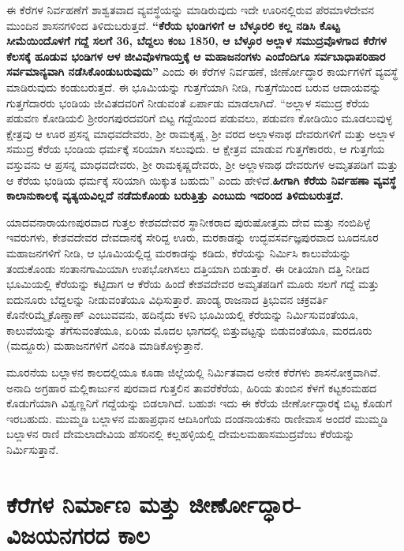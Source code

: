 ಈ ಕೆರೆಗಳ ನಿರ್ವಹಣೆಗೆ ಶಾಶ್ವತವಾದ ವ್ಯವಸ್ಥೆಯನ್ನು ಮಾಡಿರುವುದು ಇದೇ ಊರಿನಲ್ಲಿರುವ ಪೆರಮಾಳೆದೇವನ ಮುಂದಿನ ಶಾಸನಗಳಿಂದ ತಿಳಿದುಬರುತ್ತದೆ. \textbf{“ಕೆರೆಯ ಭಂಡಿಗಳಿಗೆ ಆ ಬೆಳ್ಳೂರಲಿ ಕಲ್ಲ ನಡಿಸಿ ಕೊಟ್ಟ ಸೀಮೆಯಿಂದೊಳಗೆ ಗದ್ದೆ ಸಲಗೆ 36, ಬೆದ್ದಲು ಕಂಬ 1850, ಆ ಬೆಳ್ಳೂರ ಅಲ್ಲಾಳ ಸಮುದ್ರವೊಳಗಾದ ಕೆರೆಗಳ ಕೆಲಸಕ್ಕೆ ಹೂಡುವ ಭಂಡಿಗಳ ಆಳ ಜೀವಿವೊಳಗಾಯ್ತಕ್ಕೆ ಆ ಮಹಾಜನಂಗಳು ಎಂದೆಂದಿಗೂ ಸರ್ವಬಾಧಾಪರಿಹಾರ ಸರ್ವಮಾನ್ಯವಾಗಿ ನಡೆಸಿಕೊಂಡುಬರುವುದು”} ಎಂದು ಈ ಕೆರೆಗಳ ನಿರ್ವಹಣೆ, ಜೀರ್ಣೋದ್ಧಾರ ಕಾರ್ಯಗಳಿಗೆ ವ್ಯವಸ್ಥೆ ಮಾಡಿರುವುದು ಕಂಡುಬರುತ್ತದೆ. ಈ ಭೂಮಿಯನ್ನು ಗುತ್ತಗೆಯಾಗಿ ನೀಡಿ, ಗುತ್ತಗೆಯಿಂದ ಬರುವ ಆದಾಯವನ್ನು ಗುತ್ತಗೆದಾರರು ಭಂಡಿಯ ಜೀವಿತದವರಿಗೆ ನೀಡುವಂತೆ ಏರ್ಪಾಡು ಮಾಡಲಾಗಿದೆ. “ಅಲ್ಲಾಳ ಸಮುದ್ರ ಕೆರೆಯ ಪಡುವಣ ಕೋಡಿಯಲಿ ಶ‍್ರೀರಂಗಪುರದವರಿಗೆ ಬಿಟ್ಟ ಗದ್ದೆಯಿಂದ ಪಡುವಲು, ಪಡುವಣ ಕೋಡಿಯಿಂ ಮೂಡಲುವುಳ್ಳ ಕ್ಷೇತ್ರವು ಆ ಊರ ಪ್ರಸನ್ನ ಮಾಧವದೇವರು, ಶ‍್ರೀ ರಾಮಕೃಷ್ಣ, ಶ‍್ರೀ ವರದ ಅಲ್ಲಾಳನಾಥ ದೇವರುಗಳಿಗೆ ಮತ್ತು ಅಲ್ಲಾಳ ಸಮುದ್ರ ಕೆರೆಯ ಭಂಡಿಯ ಧರ್ಮಕ್ಕೆ ಸರಿಯಾಗಿ ಸಲುವುದು. ಆ ಕ್ಷೇತ್ರವ ಮಾಡುವ ಗುತ್ತಗೆಕಾರರು, ಆ ಗುತ್ತಗೆಯ ವಸ್ತುವನು ಆ ಪ್ರಸನ್ನ ಮಾಧವದೇವರು, ಶ‍್ರೀ ರಾಮಕೃಷ್ಣದೇವರು, ಶ‍್ರೀ ಅಲ್ಲಾಳನಾಥ ದೇವರುಗಳ ಅಮೃತಪಡಿಗೆ ಮತ್ತು ಆ ಕೆರೆಯ ಭಂಡಿಯ ಧರ್ಮಕ್ಕೆ ಸರಿಯಾಗಿ ಯಿಕ್ಕುತ ಬಹುದು” ಎಂದು ಹೇಳಿದೆ.\textbf{ಹೀಗಾಗಿ ಕೆರೆಯ ನಿರ್ವಹಣಾ ವ್ಯವಸ್ಥೆ ಕಾಲಾನುಕಾಲಕ್ಕೆ ವ್ಯತ್ಯಯವಿಲ್ಲದೆ ನಡೆದುಕೊಂಡು ಬರುತ್ತಿತ್ತು ಎಂಬುದು ಇದರಿಂದ ತಿಳಿದುಬರುತ್ತದೆ. }

ಯಾದವನಾರಾಯಣಪುರವಾದ ಗುತ್ತಲ ಕೇಶವದೇವರ ಸ್ಥಾನೀಕರಾದ ಪುರುಷೋತ್ತಮ ದೇವ ಮತ್ತು ನಂಬಿಪಿಳ್ಳೆ ಇವರುಗಳು, ಕೇಶವದೇವರ ದೇವದಾನಕ್ಕೆ ಸೇರಿದ್ದ ಊರು, ಮರಕಾಡನ್ನು ಉದ್ಭವಸರ್ವಜ್ಞಪುರವಾದ ಬೂದನೂರ ಮಹಾಜನ\-ಗಳಿಗೆ ನೀಡಿ, ಆ ಭೂಮಿಯಲ್ಲಿದ್ದ ಮರಕಾಡನ್ನು ಕಡಿದು, ಕೆರೆಯನ್ನು ನಿರ್ಮಿಸಿ ಕಾಲುವೆಯನ್ನು ತಂದುಕೊಂಡು ಸಂತಾನಗಾಮಿ\-ಯಾಗಿ ಉಪಭೋಗಿಸಲು ದತ್ತಿಯಾಗಿ ಬಿಡುತ್ತಾರೆ. ಈ ರೀತಿಯಾಗಿ ದತ್ತಿ ನೀಡಿದ ಭೂಮಿಯಲ್ಲಿ ಕೆರೆಯನ್ನು ಕಟ್ಟಿದಾಗ ಆ ಕೆರೆಯ ಹಿಂದೆ ಕೇಶವದೇವರ ಅಮೃತಪಡಿಗೆ ಮೂರು ಸಲಗೆ ಗದ್ದೆ ಮತ್ತು ಐದುನೂರು ಬೆದ್ದಲನ್ನು ನೀಡುವಂತೆಯೂ ವಿಧಿಸುತ್ತಾರೆ. ಪಾಂಡ್ಯ ರಾಜನಾದ ತ್ರಿಭುವನ ಚಕ್ರವರ್ತಿ ಕೊನೇರಿಮ್ಮೈಕೊಣ್ಡಾಣ್​ ಎಂಬುವವನು, ಹದಿನೈದು ಕಳನಿ ಭೂಮಿಯಲ್ಲಿ ಕೆರೆಯನ್ನು ನಿರ್ಮಿಸುವಂತೆಯೂ, ಕಾಲುವೆಯನ್ನು ತೆಗೆಸುವಂತೆಯೂ, ಏರಿಯ ಮೊದಲ ಭಾಗದಲ್ಲಿ ಬಿತ್ತುವಟ್ಟನ್ನು ಬಿಡುವಂತೆಯೂ, ಮರದೂರು (ಮದ್ದೂರು) ಮಹಾಜನಗಳಿಗೆ ವಿನಂತಿ ಮಾಡಿಕೊಳ್ಳುತ್ತಾನೆ.

ಮೂರನೆಯ ಬಲ್ಲಾಳನ ಕಾಲದಲ್ಲಿಯೂ ಕೂಡಾ ಜಿಲ್ಲೆಯಲ್ಲಿ ನಿರ್ಮಿತವಾದ ಅನೇಕ ಕೆರೆಗಳು ಶಾಸನೋಕ್ತವಾಗಿವೆ. ಅನಾದಿ ಅಗ್ರಹಾರ ಮಲ್ಲಿಕಾರ್ಜುನ ಪುರವಾದ ಗುತ್ತಲಿನ ತಾವರೆಕೆರೆಯ, ಹಿರಿಯ ತುಂಬಿನ ಕೆಳಗೆ ಕಟ್ಟಕಂಮಹದ ಕೊಡುಗೆಯಾಗಿ ವಿಶ್ವಣ್ಣನಿಗೆ ಗದ್ದೆಯನ್ನು ಬಿಡಲಾಗಿದೆ. ಬಹುಶಃ ಇದು ಈ ಕೆರೆಯ ಜೀರ್ಣೋದ್ಧಾರಕ್ಕೆ ಬಿಟ್ಟ ಕೊಡುಗೆ ಇರಬಹುದು. ಮುಮ್ಮಡಿ ಬಲ್ಲಾಳನ ಮಹಾಪ್ರಧಾನ ಆದಿಸಿಂಗೆಯ ದಂಡನಾಯಕನು ರಾಣೀವಾಸ ಅಂದರೆ ಮುಮ್ಮಡಿ ಬಲ್ಲಾಳನ ರಾಣಿ ದೇಮಲಾದೇವಿಯ ಹೆಸರಿನಲ್ಲಿ ಕಲ್ಲಹಳ್ಳಿಯಲ್ಲಿ ದೇಮಲಮಹಾಸಮುದ್ರವೆಂಬ ಕೆರೆಯನ್ನು ನಿರ್ಮಿಸುತ್ತಾನೆ.


\section{ಕೆರೆಗಳ ನಿರ್ಮಾಣ ಮತ್ತು ಜೀರ್ಣೋದ್ಧಾರ-ವಿಜಯನಗರದ ಕಾಲ}

